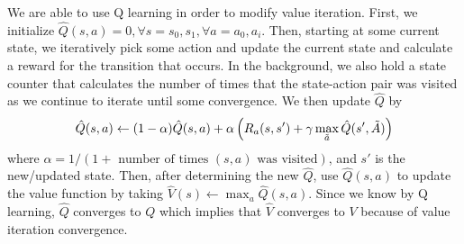 We are able to use Q learning in order to modify value iteration. First, we initialize $\hat{Q}(s,a) = 0, \forall s = s_0, s_1, \forall a = a_0, a_i$.
Then, starting at some current state, we iteratively pick some action and update the current state and calculate a reward for the transition that occurs. In the background, we also hold a state counter that calculates the number of times that the state-action pair was visited as we continue to iterate until some convergence. 
We then update $\hat{Q}$ by
\begin{equation*}
    \hat{Q}(s, a) \leftarrow (1 - \alpha) \hat{Q}(s,a) + \alpha \left( R_a(s, s') + \gamma \max_{\Tilde{a}} \hat{Q}(s', \Tilde{A}) \right)
\end{equation*}
where $\alpha = 1/(1 + \text{ number of times } (s,a) \text{ was visited})$, and $s'$ is the new/updated state. 
Then, after determining the new $\hat{Q}$, use $\hat{Q}(s,a)$ to update the value function by taking $\hat{V}(s) \leftarrow \max_a \hat{Q}(s,a)$. Since we know by Q learning, $\hat{Q}$ converges to $Q$ which implies that $\hat{V}$ converges to $V$ because of value iteration convergence.